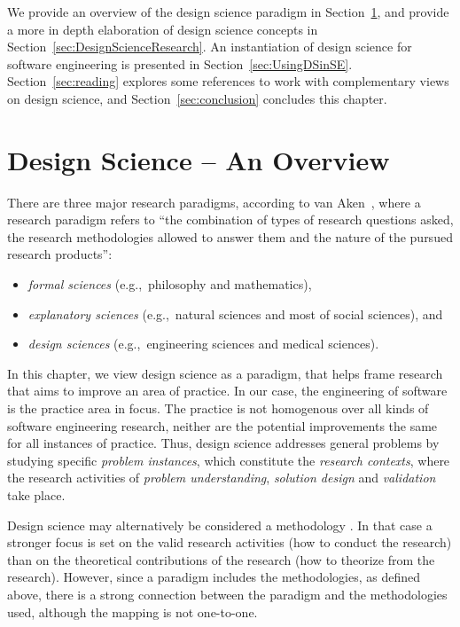 \documentclass[graybox]{svmult}
\begin{document}
We provide an overview of the design science paradigm in Section~\ref{sec:overview}, and provide a more in depth elaboration of design science concepts in Section~\ref{sec:DesignScienceResearch}. An instantiation of design science for software engineering is presented in Section~\ref{sec:UsingDSinSE}. Section~\ref{sec:reading} explores some references to work with complementary views on design science, and Section~\ref{sec:conclusion} concludes this chapter.


\section{Design Science -- An Overview}
\label{sec:overview}


There are three major research paradigms, according to van Aken~\cite{van_aken_management_2004}, where a research paradigm refers to ``the combination of types of research questions asked, the research methodologies allowed to answer them and the nature of the pursued research products'':
\begin{itemize}
\item \emph{formal sciences} (e.g.,\ philosophy and mathematics), 
\item \emph{explanatory sciences} (e.g.,\ natural sciences and most of social sciences), and 
\item \emph{design sciences} (e.g.,\ engineering sciences and medical sciences).  
\end{itemize}

In this chapter, we view design science as a paradigm, that helps frame research that aims to improve an area of practice. In our case, the engineering of software is the practice area in focus. The practice is not homogenous over all kinds of software engineering research, neither are the potential improvements the same for all instances of practice. Thus, design science addresses general problems by studying  specific \emph{problem instances}, which constitute the \emph{research contexts}, where the research activities of \emph{problem understanding}, \emph{solution design} and \emph{validation} take place.

Design science may alternatively be considered a methodology \cite{Wohlin2015}. In that case a stronger focus is set on the valid research activities (how to conduct the research) than on the theoretical contributions of the research (how to theorize from the research). However, since a paradigm includes the methodologies, as defined above, there is a strong connection between the paradigm and the methodologies used, although the mapping is not one-to-one.
\end{document}
